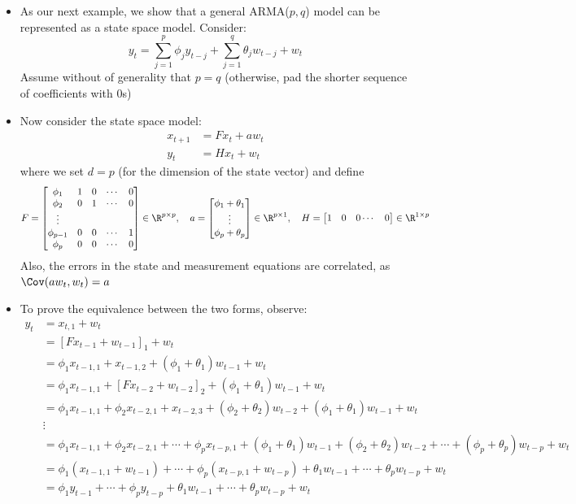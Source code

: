 \documentclass{article}
\begin{document}
\begin{itemize}
\item As our next example, we show that a general ARMA($p,q$) model can be 
  represented as a state space model. Consider: 
  \[
  y_t = \sum_{j=1}^p \phi_j y_{t-j} + \sum_{j=1}^q \theta_j w_{t-j} + w_t
  \]
  Assume without of generality that $p = q$ (otherwise, pad the shorter sequence
  of coefficients with 0s)

\item Now consider the state space model: 
  \begin{align*}
  x_{t+1} &= F x_t + a w_t \\
  y_t &= H x_t + w_t
  \end{align*}  
  where we set $d = p$ (for the dimension of the state vector) and define 
\[
  F = 
    \begin{bmatrix} 
    \phi_1 & 1 & 0 & \cdots & 0 \\
    \phi_2 & 0 & 1 & \cdots & 0 \\
    \vdots & & & & \\
    \phi_{p-1} & 0 & 0 & \cdots & 1 \\
    \phi_p & 0 & 0 & \cdots & 0
    \end{bmatrix} \in \R^{p \times p}, \quad
  a =
    \begin{bmatrix} 
    \phi_1 + \theta_1 \\
    \vdots \\
    \phi_p + \theta_p
    \end{bmatrix} \in \R^{p \times 1}, \quad
  H =
    \begin{bmatrix} 
    1 & 0 & 0 \cdots & 0
    \end{bmatrix} \in \R^{1 \times p}
  \]
  Also, the errors in the state and measurement equations are correlated, as
  $\Cov(a w_t, w_t) = a$    
  
\item To prove the equivalence between the two forms, observe:
  \begin{align*}
  y_t
  &= x_{t,1} + w_t \\
  &= [ F x_{t-1} + w_{t-1} ]_1 + w_t \\ 
  &= \phi_1 x_{t-1,1} + x_{t-1,2} + (\phi_1 + \theta_1) w_{t-1} + w_t \\ 
  &= \phi_1 x_{t-1,1} + [ F x_{t-2} + w_{t-2} ]_2 + (\phi_1 + \theta_1) w_{t-1}
    + w_t \\  
  &= \phi_1 x_{t-1,1} + \phi_2 x_{t-2,1} + x_{t-2,3} + (\phi_2 + \theta_2)
    w_{t-2} + (\phi_1 + \theta_1) w_{t-1} + w_t \\  
  &\vdots \\
  &= \phi_1 x_{t-1,1} + \phi_2 x_{t-2,1} + \cdots + \phi_p x_{t-p,1} + 
    (\phi_1 + \theta_1) w_{t-1} + (\phi_2 + \theta_2) w_{t-2} + \cdots +
    (\phi_p + \theta_p) w_{t-p} + w_t \\
  &= \phi_1 (x_{t-1,1} + w_{t-1}) + \cdots + \phi_p (x_{t-p,1} + w_{t-p}) + 
    \theta_1 w_{t-1} + \cdots + \theta_p w_{t-p} + w_t \\
  &= \phi_1 y_{t-1} + \cdots + \phi_p y_{t-p} + \theta_1 w_{t-1} + \cdots +
    \theta_p w_{t-p} + w_t  
\end{align*}
\end{itemize}
\end{document}
